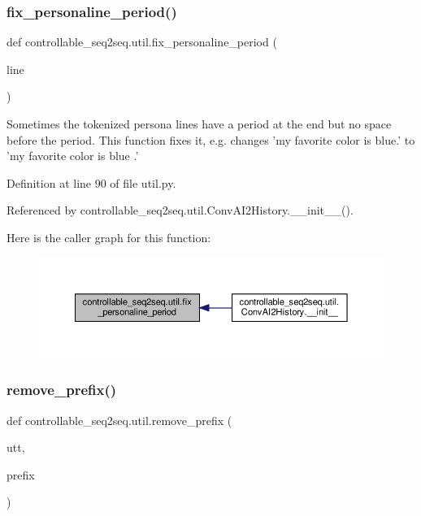 \subsubsection{\texorpdfstring{fix\+\_\+personaline\+\_\+period()}{fix\_personaline\_period()}}
{\footnotesize\ttfamily def controllable\+\_\+seq2seq.\+util.\+fix\+\_\+personaline\+\_\+period (\begin{DoxyParamCaption}\item[{}]{line }\end{DoxyParamCaption})}

\begin{DoxyVerb}Sometimes the tokenized persona lines have a period at the end but no space before
the period. This function fixes it, e.g. changes
  'my favorite color is blue.' to 'my favorite color is blue .'
\end{DoxyVerb}
 

Definition at line 90 of file util.\+py.



Referenced by controllable\+\_\+seq2seq.\+util.\+Conv\+A\+I2\+History.\+\_\+\+\_\+init\+\_\+\+\_\+().

Here is the caller graph for this function\+:
\nopagebreak
\begin{figure}[H]
\begin{center}
\leavevmode
\includegraphics[width=350pt]{namespacecontrollable__seq2seq_1_1util_ac43b54c05e08b32a3732af240d957cec_icgraph}
\end{center}
\end{figure}
\mbox{\label{namespacecontrollable__seq2seq_1_1util_a6667311d5a790733c7e4bee96705e5fe}} 
\subsubsection{\texorpdfstring{remove\+\_\+prefix()}{remove\_prefix()}}
{\footnotesize\ttfamily def controllable\+\_\+seq2seq.\+util.\+remove\+\_\+prefix (\begin{DoxyParamCaption}\item[{}]{utt,  }\item[{}]{prefix }\end{DoxyParamCaption})}

